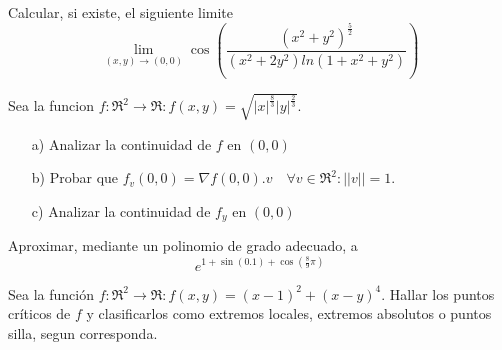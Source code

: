 
\begin{question}

Calcular, si existe, el siguiente limite
\[
        \lim_{(x,y)\to(0,0)} \cos\left({\frac{(x^2 + y^2)^{\frac{5}{2}}}{(x^2+2y^2)ln(1+x^2+y^2)}} \right)
    \]

\end{question}
\begin{question}
   Sea la funcion $f:\Re^2\rightarrow\Re: f(x,y)=\sqrt{|x|^{\frac{8}{3}}|y|^{\frac{2}{3}}}$.
\begin{itemize}
    \item[a)] Analizar la continuidad de $f$ en $(0,0)$
     \item[b)] Probar que  $f_v(0,0)=\nabla f(0,0).v \quad \forall v \in \Re^2: ||v||=1.$
      \item[c)] Analizar la continuidad de $f_y $ en $(0,0)$
\end{itemize}
\end{question}

\begin{question}
    Aproximar, mediante un polinomio de grado adecuado, a
    \[
        e^{1 + \sin(0.1) + \cos\left(\frac{8}{9} \pi\right)}
    \]
\end{question}
\begin{question}
    Sea la función $f:\Re^2 \rightarrow \Re : f(x,y)=(x-1)^2 + (x-y)^4$. Hallar los puntos críticos de $f$ y clasificarlos como extremos locales, extremos absolutos o puntos silla, segun corresponda.
\end{question}
\newpage

